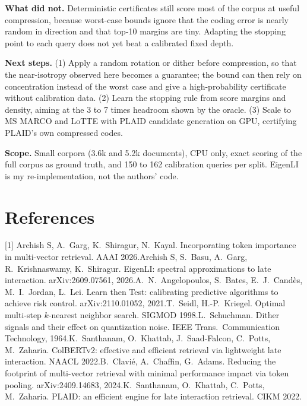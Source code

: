 \textbf{What did not.} Deterministic certificates still score most of the corpus at useful compression, because worst-case bounds ignore that the coding error is nearly random in direction and that top-10 margins are tiny. Adapting the stopping point to each query does not yet beat a calibrated fixed depth.

\textbf{Next steps.} (1) Apply a random rotation or dither \cite{5} before compression, so that the near-isotropy observed here becomes a guarantee; the bound can then rely on concentration instead of the worst case and give a high-probability certificate without calibration data. (2) Learn the stopping rule from score margins and density, aiming at the 3 to 7 times headroom shown by the oracle. (3) Scale to MS MARCO and LoTTE with PLAID candidate generation on GPU, certifying PLAID's own compressed codes.

\textbf{Scope.} Small corpora (3.6k and 5.2k documents), CPU only, exact scoring of the full corpus as ground truth, and 150 to 162 calibration queries per split. EigenLI is my re-implementation, not the authors' code.

\section*{References}
{\small
[1] Archish S, A.\ Garg, K.\ Shiragur, N.\ Kayal. Incorporating token importance in multi-vector retrieval. AAAI 2026.\quad
[2] Archish S, S.\ Basu, A.\ Garg, R.\ Krishnaswamy, K.\ Shiragur. EigenLI: spectral approximations to late interaction. arXiv:2609.07561, 2026.\quad
[3] A.\ N.\ Angelopoulos, S.\ Bates, E.\ J.\ Cand\`es, M.\ I.\ Jordan, L.\ Lei. Learn then Test: calibrating predictive algorithms to achieve risk control. arXiv:2110.01052, 2021.\quad
[4] T.\ Seidl, H.-P.\ Kriegel. Optimal multi-step $k$-nearest neighbor search. SIGMOD 1998.\quad
[5] L.\ Schuchman. Dither signals and their effect on quantization noise. IEEE Trans.\ Communication Technology, 1964.\quad
[6] K.\ Santhanam, O.\ Khattab, J.\ Saad-Falcon, C.\ Potts, M.\ Zaharia. ColBERTv2: effective and efficient retrieval via lightweight late interaction. NAACL 2022.\quad
[7] B.\ Clavi\'e, A.\ Chaffin, G.\ Adams. Reducing the footprint of multi-vector retrieval with minimal performance impact via token pooling. arXiv:2409.14683, 2024.\quad
[8] K.\ Santhanam, O.\ Khattab, C.\ Potts, M.\ Zaharia. PLAID: an efficient engine for late interaction retrieval. CIKM 2022.}
